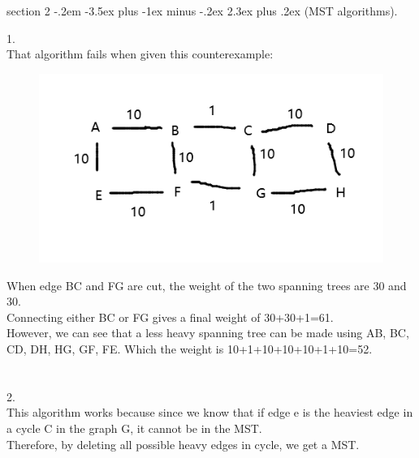 \documentclass{article}
\makeatletter
\newenvironment{problem}{\@startsection
       {section}
       {2}
       {-.2em}
       {-3.5ex plus -1ex minus -.2ex}
       {2.3ex plus .2ex}
       {\pagebreak[3]%
       \large\bf\noindent{Problem }
       }
       }
\makeatother
\begin{document}
\newpage

\begin{problem}{(MST algorithms).}

1. \\
That algorithm fails when given this counterexample:\\

\begin{figure}[h]
  \includegraphics{p1ce.png}
\end{figure}

When edge BC and FG are cut, the weight of the two spanning trees are 30 and 30.\\
Connecting either BC or FG gives a final weight of 30+30+1=61.\\
However, we can see that a less heavy spanning tree can be made using AB, BC, CD, DH, HG, GF, FE. Which the weight is 10+1+10+10+10+1+10=52.\\
\\ \hspace*{\fill} \\
2. \\
This algorithm works because since we know that if edge e is the heaviest edge in a cycle C in the graph G, it cannot be in the MST.\\
Therefore, by deleting all possible heavy edges in cycle, we get a MST.

\end{problem}
\end{document}

